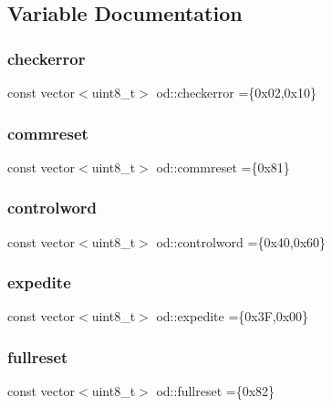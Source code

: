 \subsection{Variable Documentation}
\mbox{\label{namespaceod_ac4b980a10ae256ea019a767459b6ba9b}} 
\subsubsection{\texorpdfstring{checkerror}{checkerror}}
{\footnotesize\ttfamily const vector$<$uint8\+\_\+t$>$ od\+::checkerror =\{0x02,0x10\}}

\mbox{\label{namespaceod_a75b2ed7fb6e21d4335334e1525fd223c}} 
\subsubsection{\texorpdfstring{commreset}{commreset}}
{\footnotesize\ttfamily const vector$<$uint8\+\_\+t$>$ od\+::commreset =\{0x81\}}

\mbox{\label{namespaceod_acb23d3cf4cdb0ce0c85a884a5a97ac00}} 
\subsubsection{\texorpdfstring{controlword}{controlword}}
{\footnotesize\ttfamily const vector$<$uint8\+\_\+t$>$ od\+::controlword =\{0x40,0x60\}}

\mbox{\label{namespaceod_ae572be966c7d5de90544f2ac32dbbd38}} 
\subsubsection{\texorpdfstring{expedite}{expedite}}
{\footnotesize\ttfamily const vector$<$uint8\+\_\+t$>$ od\+::expedite =\{0x3\+F,0x00\}}

\mbox{\label{namespaceod_af9d6d0e820d6bc1ee375195e253f7b7b}} 
\subsubsection{\texorpdfstring{fullreset}{fullreset}}
{\footnotesize\ttfamily const vector$<$uint8\+\_\+t$>$ od\+::fullreset =\{0x82\}}

